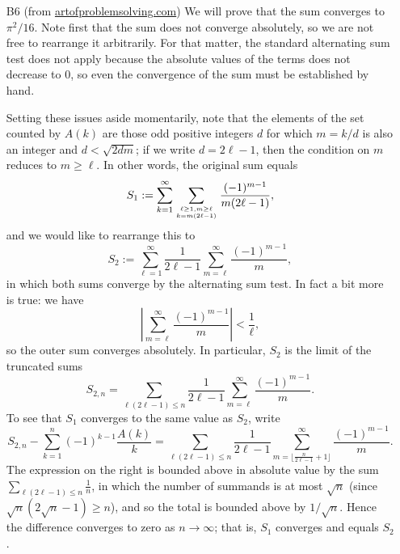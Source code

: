 \documentclass[amssymb,twocolumn,pra,10pt,aps]{revtex4-1}
\newcommand{\ee}{\ell}
\begin{document}
\begin{itemize}
\item[B6]
(from \url{artofproblemsolving.com})
We will prove that the sum converges to $\pi^2/16$.
Note first that the sum does not converge absolutely, so we are not free to rearrange it arbitrarily. For that matter, the standard alternating sum test does not apply because the absolute values of the terms does not decrease to 0, so even the convergence of the sum must be established by hand.

Setting these issues aside momentarily, note that
the elements of the set counted by $A(k)$ are those odd positive integers $d$ for which $m = k/d$ is also an integer and $d < \sqrt{2dm}$; if we write $d = 2\ee-1$, then the condition on $m$ reduces to $m \geq \ee$. In other words, the original sum equals
\[
S_1 := \sum_{k=1}^\infty \sum_{{\ee \geq 1, m \geq \ee}\atop{k = m(2\ee-1)}} \frac{(-1)^{m-1}}{m(2\ee-1)},
\]
and we would like to rearrange this to
\[
S_2 := \sum_{\ee=1}^\infty \frac{1}{2\ee-1} \sum_{m=\ee}^\infty \frac{(-1)^{m-1}}{m},
\]
in which both sums converge by the alternating sum test. In fact a bit more is true:
we have
\[
\left| \sum_{m=\ee}^\infty \frac{(-1)^{m-1}}{m} \right| < \frac{1}{\ee},
\]
so the outer sum converges absolutely.
In particular, $S_2$ is the limit of the truncated sums
\[
S_{2,n} = \sum_{\ee(2\ee-1) \leq n} \frac{1}{2\ee-1} \sum_{m=\ee}^\infty \frac{(-1)^{m-1}}{m}.
\]
To see that $S_1$ converges to the same value as $S_2$, write
\[
S_{2,n} - \sum_{k=1}^n (-1)^{k-1} \frac{A(k)}{k} =
\sum_{\ee(2\ee-1) \leq n} \frac{1}{2\ee-1} \sum_{m=\lfloor \frac{n}{2\ee-1}+1 \rfloor}^\infty
\frac{(-1)^{m-1}}{m}.
\]
The expression on the right is bounded above in absolute value by the sum $\sum_{\ee(2\ee-1) \leq n} \frac{1}{n}$, in which the number of summands is
at most $\sqrt{n}$ (since $\sqrt{n}(2\sqrt{n}-1)\geq n$), and so the total is bounded above by $1/\sqrt{n}$.
Hence the difference converges to zero as $n \to \infty$; that is, $S_1$ converges and equals $S_2$.


\end{itemize}
\end{document}
